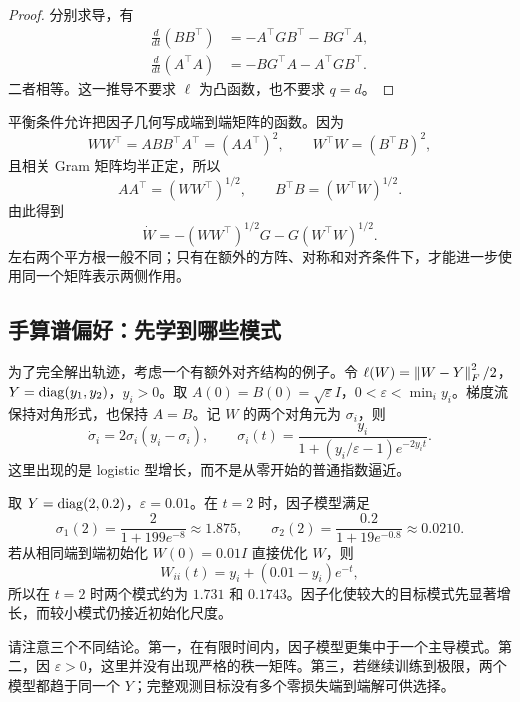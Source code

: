 \begin{proof}
分别求导，有
\begin{align*}
 \frac{d}{dt}(BB^\top)
 &=-A^\top GB^\top-BG^\top A,\\
 \frac{d}{dt}(A^\top A)
 &=-BG^\top A-A^\top GB^\top.
\end{align*}
二者相等。这一推导不要求 $\ell$ 为凸函数，也不要求 $q=d$。
\end{proof}

平衡条件允许把因子几何写成端到端矩阵的函数。因为
\[
 WW^\top=ABB^\top A^\top=(AA^\top)^2,
 \qquad
 W^\top W=(B^\top B)^2,
\]
且相关 Gram 矩阵均半正定，所以
\begin{equation}
 AA^\top=(WW^\top)^{1/2},
 \qquad B^\top B=(W^\top W)^{1/2}.
\end{equation}
由此得到
\begin{equation}
 \boxed{\dot W=-(WW^\top)^{1/2}G-G(W^\top W)^{1/2}}.
 \label{l5:balanced-product-flow}
\end{equation}
左右两个平方根一般不同；只有在额外的方阵、对称和对齐条件下，才能进一步使用同一个矩阵表示两侧作用。

\subsection{手算谱偏好：先学到哪些模式}

为了完全解出轨迹，考虑一个有额外对齐结构的例子。令
$\ell(W)=\left\lVert W-Y\right\rVert_F^2/2$，$Y=\operatorname{diag}(y_1,y_2)$，$y_i>0$。取
$A(0)=B(0)=\sqrt\varepsilon I$，$0<\varepsilon<\min_i y_i$。梯度流保持对角形式，也保持 $A=B$。记 $W$ 的两个对角元为 $\sigma_i$，则
\begin{equation}
 \dot\sigma_i=2\sigma_i(y_i-\sigma_i),
 \qquad
 \sigma_i(t)=\frac{y_i}{1+(y_i/\varepsilon-1)e^{-2y_it}}.
 \label{l5:logistic-singular}
\end{equation}
这里出现的是 logistic 型增长，而不是从零开始的普通指数逼近。

\begin{example}[完整观测下的暂态谱偏好]
取 $Y=\operatorname{diag}(2,0.2)$，$\varepsilon=0.01$。在 $t=2$ 时，因子模型满足
\[
 \sigma_1(2)=\frac2{1+199e^{-8}}\approx1.875,
 \qquad
 \sigma_2(2)=\frac{0.2}{1+19e^{-0.8}}\approx0.0210.
\]
若从相同端到端初始化 $W(0)=0.01I$ 直接优化 $W$，则
\[
 W_{ii}(t)=y_i+(0.01-y_i)e^{-t},
\]
所以在 $t=2$ 时两个模式约为 $1.731$ 和 $0.1743$。因子化使较大的目标模式先显著增长，而较小模式仍接近初始化尺度。

请注意三个不同结论。第一，在有限时间内，因子模型更集中于一个主导模式。第二，因 $\varepsilon>0$，这里并没有出现严格的秩一矩阵。第三，若继续训练到极限，两个模型都趋于同一个 $Y$；完整观测目标没有多个零损失端到端解可供选择。
\end{example}


